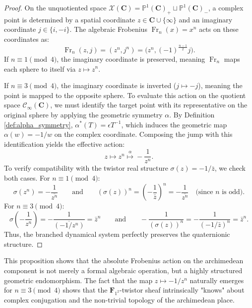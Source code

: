 \documentclass[11pt,a4paper]{article}
\let\mathscr\mathscr
\newcommand{\C}{\mathbf{C}}
\newcommand{\Ftwo}{\mathbf{F}_{1^2}}
\newcommand{\minf}{\mathscr C_\infty}
\newcommand{\frob}{{\operatorname{Fr}}}
\begin{document}
\begin{proof}
On the unquotiented space $\mathcal X(\C) = \mathbb{P}^1(\C)_+ \sqcup \mathbb{P}^1(\C)_-$, a complex point is determined by a spatial coordinate $z \in \C \cup \{\infty\}$ and an imaginary coordinate $j \in \{i, -i\}$. The algebraic Frobenius $\frob_n(x) = x^n$ acts on these coordinates as:
\[
\frob_n(z, j) = (z^n, j^n) = \big(z^n, (-1)^{\frac{n-1}{2}} j\big).
\]
If $n \equiv 1 \pmod 4$, the imaginary coordinate is preserved, meaning $\frob_n$ maps each sphere to itself via $z \mapsto z^n$. 

If $n \equiv 3 \pmod 4$, the imaginary coordinate is inverted ($j \mapsto -j$), meaning the point is mapped to the opposite sphere. To evaluate this action on the quotient space $\minf(\C)$, we must identify the target point with its representative on the original sphere by applying the geometric symmetry $\alpha$. By Definition \ref{def:alpha_symmetry}, $\alpha^*(T) = \epsilon T^{-1}$, which induces the geometric map $\alpha(w) = -1/w$ on the complex coordinate. Composing the jump with this identification yields the effective action:
\[
z \longmapsto z^n \stackrel{\alpha}{\longmapsto} -\frac{1}{z^n}.
\]
To verify compatibility with the twistor real structure $\sigma(z) = -1/\bar{z}$, we check both cases. For $n \equiv 1 \pmod 4$:
\[
\sigma(z^n) = -\frac{1}{\overline{z^n}} \qquad \text{and} \qquad (\sigma(z))^n = \left(-\frac{1}{\bar{z}}\right)^n = -\frac{1}{\overline{z^n}} \quad \text{(since $n$ is odd)}.
\]
For $n \equiv 3 \pmod 4$:
\[
\sigma\left(-\frac{1}{z^n}\right) = -\frac{1}{\overline{(-1/z^n)}} = \bar{z}^n \qquad \text{and} \qquad -\frac{1}{(\sigma(z))^n} = -\frac{1}{(-1/\bar{z})^n} = \bar{z}^n.
\]
Thus, the branched dynamical system perfectly preserves the quaternionic structure.
\end{proof}


This proposition shows that the absolute Frobenius action on the archimedean component is not merely a formal algebraic operation, but a highly structured geometric endomorphism. The fact that the map $z \mapsto -1/z^n$ naturally emerges for $n \equiv 3 \pmod 4$ shows that the $\Ftwo$-twistor sheaf intrinsically "knows" about complex conjugation and the non-trivial topology of the archimedean place.
\end{document}
